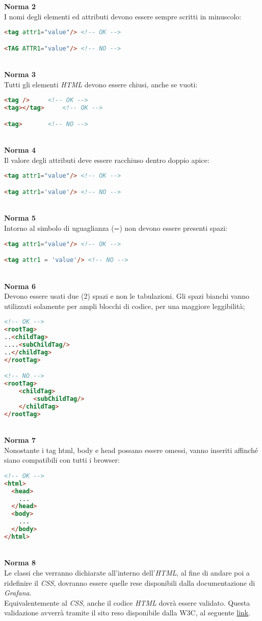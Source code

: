 \textbf{Norma 2}\\
I nomi degli elementi ed attributi devono essere sempre scritti in minuscolo: \\
	\begin{lstlisting}[language=HTML]
<tag attr1="value"/> <!-- OK -->

<TAG ATTR1="value"/> <!-- NO -->
\end{lstlisting}
\-\\
\textbf{Norma 3}\\
Tutti gli elementi \textit{HTML} devono essere chiusi, anche se vuoti: \\
	\begin{lstlisting}[language=HTML]
<tag /> 	<!-- OK -->
<tag></tag> 	<!-- OK -->

<tag> 		<!-- NO -->

\end{lstlisting}
\-\\
\textbf{Norma 4}\\
Il valore degli attributi deve essere racchiuso dentro doppio apice:\\
	\begin{lstlisting}[language=HTML]
<tag attr1="value"/> <!-- OK -->

<tag attr1='value'/> <!-- NO -->
\end{lstlisting}
\-\\
\textbf{Norma 5}\\
Intorno al simbolo di uguaglianza (=) non devono essere presenti spazi:\\
\begin{lstlisting}[language=HTML]
<tag attr1="value"/> <!-- OK -->

<tag attr1 = 'value'/> <!-- NO -->
\end{lstlisting}
\-\\
\textbf{Norma 6}\\
Devono essere usati due (2) spazi e non le tabulazioni. Gli spazi bianchi vanno utilizzati solamente per ampli blocchi di codice, per una maggiore leggibilità; \\
\begin{lstlisting}[language=HTML]
<!-- OK -->
<rootTag>
..<childTag>
....<subChildTag/>
..</childTag>  
</rootTag>

<!-- NO -->
<rootTag>
	<childTag>
		<subChildTag/>
	</childTag>  
</rootTag>
\end{lstlisting}
\-\\
\textbf{Norma 7}\\
Nonostante i tag html, body e head possano essere omessi, vanno inseriti affinché siano compatibili con tutti i browser:\\
\begin{lstlisting}[language=HTML]
<!-- OK -->
<html>
  <head>
    ...
  </head>
  <body>
    ...
  </body>
</html>
\end{lstlisting}
\-\\
\textbf{Norma 8}\\
Le classi che verranno dichiarate all'interno dell'\textit{HTML}, al fine di andare poi a ridefinire il \textit{CSS}, dovranno essere quelle rese disponibili dalla documentazione di \textit{Grafana}.	\\

Equivalentemente al \textit{CSS}, anche il codice \textit{HTML} dovrà essere validato. Questa validazione avverrà tramite il sito reso disponibile dalla W3C, al seguente \href{https://validator.w3.org/}{link}.

